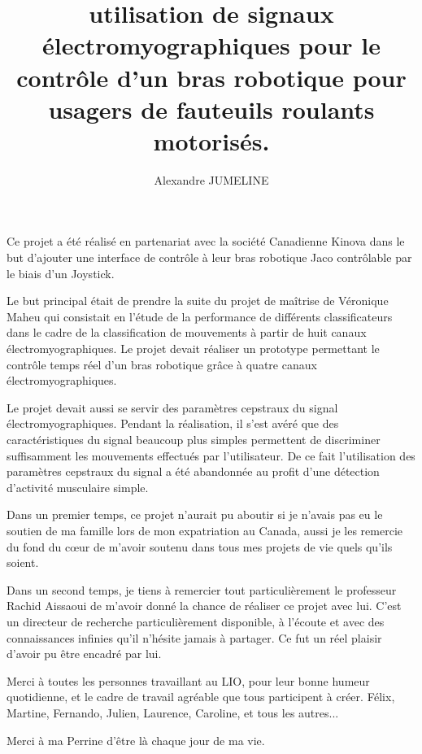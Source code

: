 \documentclass[letterpaper, twoside, 12pt, memoire, creativecommons, hyperref]{thETS}
\title{utilisation de signaux électromyographiques pour le contrôle d'un bras robotique pour usagers de fauteuils roulants motorisés.}
\author{Alexandre JUMELINE}
\begin{document}

\maketitle

\presentjury

\begin{avantpropos}
Ce projet a été réalisé en partenariat avec la société Canadienne Kinova dans le but d'ajouter une interface de contrôle à leur bras robotique Jaco contrôlable par le biais d'un Joystick. 

Le but principal était de prendre la suite du projet de maîtrise de Véronique Maheu qui consistait en l'étude de la performance de différents classificateurs dans le cadre de la classification de mouvements à partir de huit canaux électromyographiques. Le projet devait réaliser un prototype permettant le contrôle temps réel d'un bras robotique grâce à quatre canaux électromyographiques.

Le projet devait aussi se servir des paramètres cepstraux du signal électromyographiques. Pendant la réalisation, il s'est avéré que des caractéristiques du signal beaucoup plus simples permettent de discriminer suffisamment les mouvements effectués par l'utilisateur. De ce fait l'utilisation des paramètres cepstraux du signal a été abandonnée au profit d'une détection d'activité musculaire simple.
\end{avantpropos}

\begin{remerciements}
Dans un premier temps, ce projet n'aurait pu aboutir si je n'avais pas eu le soutien de ma famille lors de mon expatriation au Canada, aussi je les remercie du fond du cœur de m'avoir soutenu dans tous mes projets de vie quels qu'ils soient.

Dans un second temps, je tiens à remercier tout particulièrement le professeur Rachid Aissaoui de m'avoir donné la chance de réaliser ce projet avec lui. C'est un directeur de recherche particulièrement disponible, à l'écoute et avec des connaissances infinies qu'il n'hésite jamais à partager. Ce fut un réel plaisir d'avoir pu être encadré par lui.

Merci à toutes les personnes travaillant au LIO, pour leur bonne humeur quotidienne, et le cadre de travail agréable que tous participent à créer. Félix, Martine, Fernando, Julien, Laurence, Caroline, et tous les autres...

Merci à ma Perrine d'être là chaque jour de ma vie.
\end{remerciements}
\end{document}
